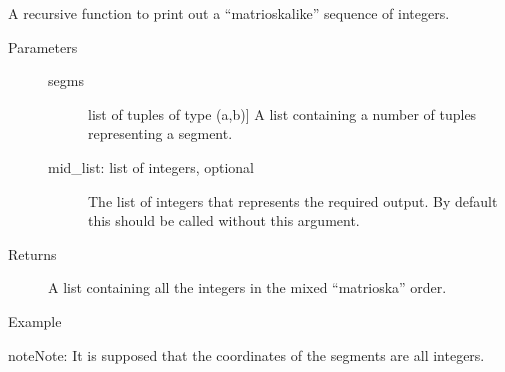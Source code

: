 \documentclass[letterpaper,10pt,english]{sphinxmanual}
\begin{document}
\begin{fulllineitems}
\label{\detokenize{appendices:s2Dcd.s2Dcd.split_segms}}
A recursive function to print out a “matrioska\sphinxhyphen{}like” sequence of
integers.
\begin{description}
\item[{Parameters}] \leavevmode\begin{description}
\item[{segms}] \leavevmode{[}list of tuples of type (a,b){]}
A list containing a number of tuples representing a segment.

\item[{mid\_list: list of integers, optional}] \leavevmode
The list of integers that represents the required output.
By default this should be called without this argument.

\end{description}

\item[{Returns}] \leavevmode
A list containing all the integers in the mixed “matrioska” order.

\item[{Example}] \leavevmode
\begin{sphinxVerbatim}[commandchars=\\\{\}]
\PYG{p}{[}\PYG{p}{]}
\end{sphinxVerbatim}

\end{description}

\begin{sphinxadmonition}{note}{Note:}
It is supposed that the coordinates of the segments are all
integers.
\end{sphinxadmonition}

\end{fulllineitems}
\end{document}
